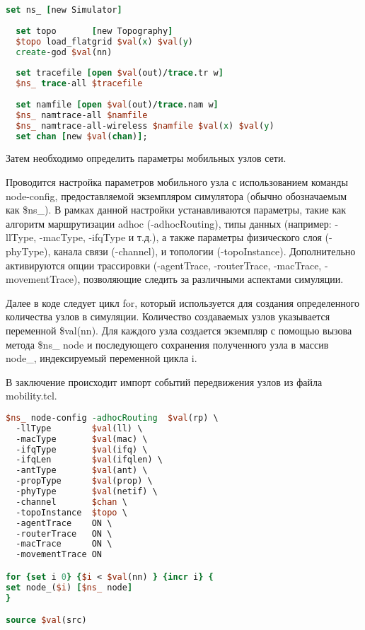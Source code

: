   \begin{lstlisting}[language=tcl, style=mystyle, caption=Определение глобальных объектов в NS-2]
  set ns_ [new Simulator]
  
  set topo       [new Topography]
  $topo load_flatgrid $val(x) $val(y)
  create-god $val(nn)
  
  set tracefile [open $val(out)/trace.tr w]
  $ns_ trace-all $tracefile
  
  set namfile [open $val(out)/trace.nam w]
  $ns_ namtrace-all $namfile
  $ns_ namtrace-all-wireless $namfile $val(x) $val(y)
  set chan [new $val(chan)];
  \end{lstlisting}

  Затем необходимо определить параметры мобильных узлов сети.

Проводится настройка параметров мобильного узла с использованием команды node-config, предоставляемой экземпляром симулятора (обычно обозначаемым как \$ns\_). В рамках данной настройки устанавливаются параметры, такие как алгоритм маршрутизации adhoc (-adhocRouting), типы данных (например: -llType, -macType, -ifqType и т.д.), а также параметры физического слоя (-phyType), канала связи (-channel), и топологии (-topoInstance). Дополнительно активируются опции трассировки (-agentTrace, -routerTrace, -macTrace, -movementTrace), позволяющие следить за различными аспектами симуляции.

Далее в коде следует цикл for, который используется для создания определенного количества узлов в симуляции. Количество создаваемых узлов указывается переменной \$val(nn). Для каждого узла создается экземпляр с помощью вызова метода \$ns\_ node и последующего сохранения полученного узла в массив node\_, индексируемый переменной цикла i.

В заключение происходит импорт событий передвижения узлов из файла mobility.tcl.

\begin{lstlisting}[language=tcl, style=mystyle, caption=Настройка узлов сети]
$ns_ node-config -adhocRouting  $val(rp) \
  -llType        $val(ll) \
  -macType       $val(mac) \
  -ifqType       $val(ifq) \
  -ifqLen        $val(ifqlen) \
  -antType       $val(ant) \
  -propType      $val(prop) \
  -phyType       $val(netif) \
  -channel       $chan \
  -topoInstance  $topo \
  -agentTrace    ON \
  -routerTrace   ON \
  -macTrace      ON \
  -movementTrace ON

for {set i 0} {$i < $val(nn) } {incr i} {
set node_($i) [$ns_ node]	
}

source $val(src)
\end{lstlisting}


